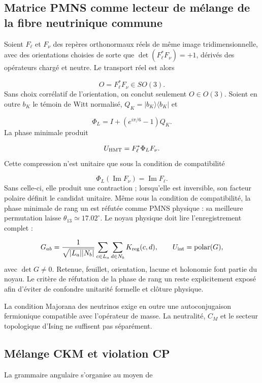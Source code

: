 
\subsection{Matrice PMNS comme lecteur de mélange de la fibre neutrinique commune}
Soient \(F_\ell\) et \(F_\nu\) des repères orthonormaux réels de même image tridimensionnelle, avec des orientations choisies de sorte que \(\det(F_\ell^*F_\nu)=+1\), dérivés des opérateurs chargé et neutre. Le transport réel est alors

\[
O=F_\ell^*F_\nu\in SO(3).
\]
Sans choix corrélatif de l'orientation, on conclut seulement \(O\in O(3)\). Soient en outre \(b_K\) le témoin de Witt normalisé, \(Q_K=|b_K\rangle\langle b_K|\) et

\[
\Phi_L=I+(e^{i\pi/6}-1)Q_K.
\]
La phase minimale produit

\[
U_{\rm HMT}=F_\ell^*\Phi_LF_\nu.
\]
Cette compression n'est unitaire que sous la condition de compatibilité

\[
\Phi_L(\operatorname{Im}F_\nu)=\operatorname{Im}F_\ell.
\]
Sans celle-ci, elle produit une contraction ; lorsqu'elle est inversible, son facteur polaire définit le candidat unitaire. Même sous la condition de compatibilité, la phase minimale de rang un est réfutée comme PMNS physique : sa meilleure permutation laisse \(\theta_{13}\simeq17.02^\circ\). Le noyau physique doit lire l'enregistrement complet :

\[
G_{ab}=
\frac1{\sqrt{|L_a||N_b|}}
\sum_{c\in L_a}\sum_{d\in N_b}K_{\rm reg}(c,d),
\qquad
U_{\rm int}=\operatorname{polar}(G),
\]
avec \(\det G\ne0\). Retenue, feuillet, orientation, lacune et holonomie font partie du noyau. Le critère de réfutation de la phase de rang un reste explicitement exposé afin d'éviter de confondre unitarité formelle et clôture physique.

La condition Majorana des neutrinos exige en outre une autoconjugaison fermionique compatible avec l'opérateur de masse. La neutralité, \(C_M\) et le secteur topologique d'Ising ne suffisent pas séparément.

\subsection{Mélange CKM et violation CP}
La grammaire angulaire s'organise au moyen de

